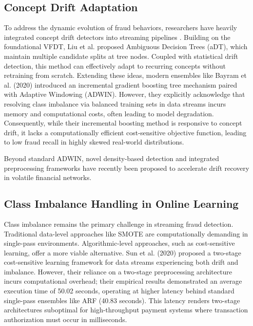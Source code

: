 \documentclass[review,12pt]{elsarticle}
\begin{document}
\subsection{Concept Drift Adaptation}
To address the dynamic evolution of fraud behaviors, researchers have heavily integrated concept drift detectors into streaming pipelines \cite{gama2014survey}. Building on the foundational VFDT, Liu et al. \cite{liu2009ambiguous} proposed Ambiguous Decision Trees (aDT), which maintain multiple candidate splits at tree nodes. Coupled with statistical drift detection, this method can effectively adapt to recurring concepts without retraining from scratch. Extending these ideas, modern ensembles like Bayram et al. (2020) \cite{bayramImprovingFraudDetection2020a} introduced an incremental gradient boosting tree mechanism paired with Adaptive Windowing (ADWIN). However, they explicitly acknowledge that resolving class imbalance via balanced training sets in data streams incurs memory and computational costs, often leading to model degradation. Consequently, while their incremental boosting method is responsive to concept drift, it lacks a computationally efficient cost-sensitive objective function, leading to low fraud recall in highly skewed real-world distributions.

Beyond standard ADWIN, novel density-based detection \cite{cuiEffectiveDensityBasedConcept2024a} and integrated preprocessing frameworks \cite{allawatiIntegratedPreprocessingDrift2025} have recently been proposed to accelerate drift recovery in volatile financial networks.

\subsection{Class Imbalance Handling in Online Learning}
Class imbalance remains the primary challenge in streaming fraud detection. Traditional data-level approaches like SMOTE are computationally demanding in single-pass environments. Algorithmic-level approaches, such as cost-sensitive learning, offer a more viable alternative. Sun et al. (2020) \cite{sunTwostageCostsensitiveLearning2020a} proposed a two-stage cost-sensitive learning framework for data streams experiencing both drift and imbalance. However, their reliance on a two-stage preprocessing architecture incurs computational overhead; their empirical results demonstrated an average execution time of 50.02 seconds, operating at higher latency behind standard single-pass ensembles like ARF \cite{gomes2017adaptive} (40.83 seconds). This latency renders two-stage architectures suboptimal for high-throughput payment systems \cite{visatps} where transaction authorization must occur in milliseconds.
\end{document}
